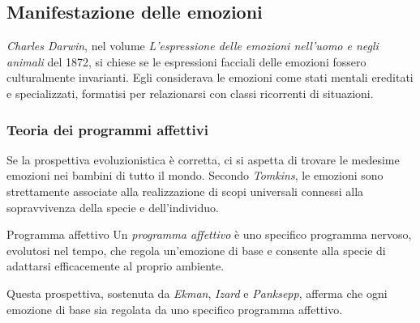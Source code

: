 \documentclass[a4paper]{article}
\begin{document}
\subsection{Manifestazione delle emozioni}
\emph{Charles Darwin}, nel volume \emph{L'espressione delle emozioni nell'uomo e negli animali} del 1872, si chiese se le espressioni facciali delle emozioni fossero culturalmente invarianti. Egli considerava le emozioni come stati mentali ereditati e specializzati, formatisi per relazionarsi con classi ricorrenti di situazioni.
\subsubsection{Teoria dei programmi affettivi}
Se la prospettiva evoluzionistica è corretta, ci si aspetta di trovare le medesime emozioni nei bambini di tutto il mondo.
Secondo \emph{Tomkins}, le emozioni sono strettamente associate alla realizzazione di scopi universali connessi alla sopravvivenza della specie e dell'individuo.
\begin{snippetdefinition}{Programma affettivo}
    Un \emph{programma affettivo} è uno specifico programma nervoso, evolutosi nel tempo, che regola un'emozione di base e consente alla specie di adattarsi efficacemente al proprio ambiente.
\end{snippetdefinition}
Questa prospettiva, sostenuta da \emph{Ekman}, \emph{Izard} e \emph{Panksepp}, afferma che ogni emozione di base sia regolata da uno specifico programma affettivo.
\end{document}

